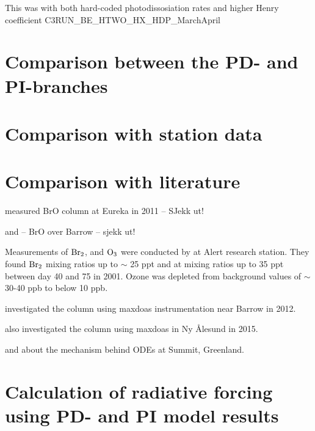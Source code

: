 This was with both hard-coded photodissosiation rates and higher Henry coefficient C3RUN\_BE\_HTWO\_HX\_HDP\_MarchApril

\section{Comparison between the PD- and PI-branches}

\section{Comparison with station data}

\section{Comparison with literature}

\cite{Zhao2016} measured BrO column at Eureka in 2011 -- SJekk ut! 


\cite{Peterson2016} and \cite{Peterson2015} -- BrO over Barrow -- sjekk ut! 

Measurements of $\mathrm{Br_2}$,  and $\mathrm{O_3}$ were conducted by \cite{Foster2001} at Alert research station. They found $\mathrm{Br_2}$ mixing ratios up to $\sim$ 25 \acrshort{ppt} and  at mixing ratios up to 35 \acrshort{ppt} between day 40 and 75 in 2001. Ozone was depleted from background values of $\sim$ 30-40 \acrshort{ppb} to below 10 ppb. 

\medskip

\cite{Simpson2017} investigated the  column using \acrlong{maxdoas} instrumentation near Barrow in 2012.

\medskip

\cite{Luo2018} also investigated the  column using \acrshort{maxdoas} in Ny Ålesund in 2015. 

\medskip

\cite{Thomas2012} and \cite{Thomas2011} about the mechanism behind ODEs at Summit, Greenland. 

\section{Calculation of radiative forcing using PD- and PI model results}